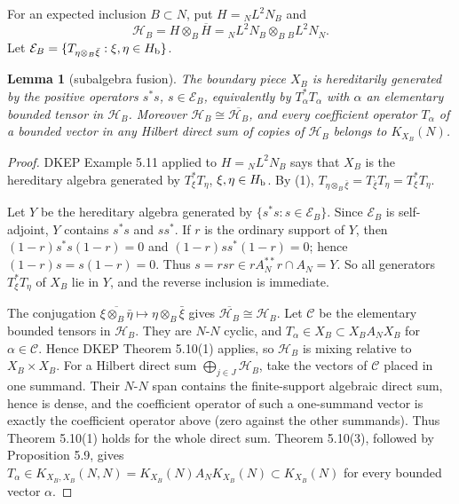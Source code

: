 \documentclass[12pt]{article}
\newtheorem{lemma}{Lemma}
\newcommand{\cH}{\mathcal H}
\begin{document}
For an expected inclusion \(B\subset N\), put \(H={}_NL^2N_B\) and
\[
        \cH_B=H\otimes_B\overline H
             ={}_NL^2N_B\otimes_B{}_BL^2N_N .
\]
Let \(\mathcal E_B=\{T_{\eta\otimes_B\bar\xi}:\xi,\eta\in H_{\rm b}\}\).

\begin{lemma}[subalgebra fusion]\label{lem:subalg}
The boundary piece \(X_B\) is hereditarily generated by the positive
operators \(s^*s\), \(s\in\mathcal E_B\), equivalently by
\(T_\alpha^*T_\alpha\) with \(\alpha\) an elementary bounded tensor in
\(\cH_B\).  Moreover \(\cH_B\cong\overline{\cH_B}\), and every coefficient
operator \(T_\alpha\) of a bounded vector in any Hilbert direct sum of copies
of \(\cH_B\) belongs to \(K_{X_B}(N)\).
\end{lemma}

\begin{proof}
DKEP Example 5.11 applied to \(H={}_NL^2N_B\) says that \(X_B\) is the
hereditary algebra generated by \(T_\xi^*T_\eta\), \(\xi,\eta\in H_{\rm b}\).
By (1), \(T_{\eta\otimes_B\bar\xi}=T_{\bar\xi}T_\eta=T_\xi^*T_\eta\).

Let \(Y\) be the hereditary algebra generated by \(\{s^*s:s\in\mathcal E_B\}\).
Since \(\mathcal E_B\) is self-adjoint, \(Y\) contains \(s^*s\) and \(ss^*\).
If \(r\) is the ordinary support of \(Y\), then
\((1-r)s^*s(1-r)=0\) and \((1-r)ss^*(1-r)=0\); hence \((1-r)s=s(1-r)=0\).
Thus \(s=rsr\in rA_N^{**}r\cap A_N=Y\).  So all generators
\(T_\xi^*T_\eta\) of \(X_B\) lie in \(Y\), and the reverse inclusion is
immediate.

The conjugation \(\overline{\xi\otimes_B\bar\eta}\mapsto
\eta\otimes_B\bar\xi\) gives \(\overline{\cH_B}\cong\cH_B\).  Let
\(\mathcal C\) be the elementary bounded tensors in \(\cH_B\).  They are
\(N\)-\(N\) cyclic, and \(T_\alpha\in X_B\subset X_BA_NX_B\) for
\(\alpha\in\mathcal C\).  Hence DKEP Theorem 5.10(1) applies, so \(\cH_B\) is
mixing relative to \(X_B\times X_B\).  For a Hilbert direct sum
\(\bigoplus_{j\in J}\cH_B\), take the vectors of \(\mathcal C\) placed in one
summand.  Their \(N\)-\(N\) span contains the finite-support algebraic direct
sum, hence is dense, and the coefficient operator of such a one-summand vector
is exactly the coefficient operator above (zero against the other summands).
Thus Theorem 5.10(1) holds for the whole direct sum.  Theorem 5.10(3), followed
by Proposition 5.9, gives \(T_\alpha\in K_{X_B,X_B}(N,N)=K_{X_B}(N)A_N
K_{X_B}(N)\subset K_{X_B}(N)\) for every bounded vector \(\alpha\).
\end{proof}
\end{document}
